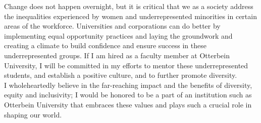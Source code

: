 \vspace{2ex}
Change does not happen overnight, but it is critical that we as a society address the inequalities experienced by women and underrepresented minorities in certain areas of the workforce.  Universities and corporations can do better by implementing equal opportunity practices and laying the groundwork and creating a climate to build confidence and ensure success in these underrepresented groups.  If I am hired as a faculty member at Otterbein University, I will be committed in my efforts to mentor these underrepresented students, and establish a positive culture, and to further promote diversity. \\
\vspace{2ex}
I wholeheartedly believe in the far-reaching impact and the benefits of diversity, equity and inclusivity; I would be honored to be a part of an institution such as Otterbein University that embraces these values and plays such a crucial role in shaping our world.
